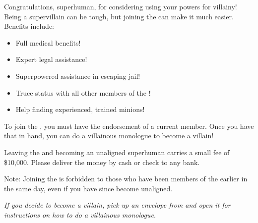 \documentclass[white]{guildcamp1}
\begin{document}
\name{\wVillainRecruitment{}}

Congratulations, superhuman, for considering using your powers for villainy!  Being a supervillain can be tough, but joining the \cVillainCompact{\intro} can make it much easier.  Benefits include:

\begin{itemize}
\item Full medical benefits!
\item Expert legal assistance!
\item Superpowered assistance in escaping jail!
\item Truce status with all other members of the \cVillainCompact{}!
\item Help finding experienced, trained minions!
\end{itemize}

To join the \cVillainCompact{}, you must have the endorsement of a current \cVillainCompact{} member.  Once you have that in hand, you can do a villainous monologue to become a villain!

Leaving the \cVillainCompact{\intro} and becoming an unaligned superhuman carries a small fee of \$10,000.  Please deliver the money by cash or check to any bank.  %

Note: Joining the \cVillainCompact{} is forbidden to those who have been members of the \cHeroLeague{\intro} earlier in the same day, even if you have since become unaligned.

\textit{If you decide to become a villain, pick up an envelope from \sBecomeVillain{} and open it for instructions on how to do a villainous monologue.}
\end{document}
